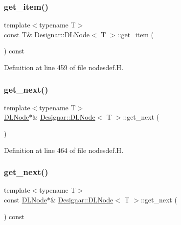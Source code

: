 \subsubsection{\texorpdfstring{get\+\_\+item()}{get\_item()}\hspace{0.1cm}{\footnotesize\ttfamily [2/2]}}
{\footnotesize\ttfamily template$<$typename T$>$ \\
const T\& \hyperlink{class_designar_1_1_d_l_node}{Designar\+::\+D\+L\+Node}$<$ T $>$\+::get\+\_\+item (\begin{DoxyParamCaption}{ }\end{DoxyParamCaption}) const\hspace{0.3cm}{\ttfamily [inline]}}



Definition at line 459 of file nodesdef.\+H.

\mbox{\label{class_designar_1_1_d_l_node_a28ad2b7a46044b5e798e06888631bbde}} 
\subsubsection{\texorpdfstring{get\+\_\+next()}{get\_next()}\hspace{0.1cm}{\footnotesize\ttfamily [1/2]}}
{\footnotesize\ttfamily template$<$typename T$>$ \\
\hyperlink{class_designar_1_1_d_l_node}{D\+L\+Node}$\ast$\& \hyperlink{class_designar_1_1_d_l_node}{Designar\+::\+D\+L\+Node}$<$ T $>$\+::get\+\_\+next (\begin{DoxyParamCaption}{ }\end{DoxyParamCaption})\hspace{0.3cm}{\ttfamily [inline]}}



Definition at line 464 of file nodesdef.\+H.

\mbox{\label{class_designar_1_1_d_l_node_a2e9212d8d5bec7b811c8ca11948bdad6}} 
\subsubsection{\texorpdfstring{get\+\_\+next()}{get\_next()}\hspace{0.1cm}{\footnotesize\ttfamily [2/2]}}
{\footnotesize\ttfamily template$<$typename T$>$ \\
const \hyperlink{class_designar_1_1_d_l_node}{D\+L\+Node}$\ast$\& \hyperlink{class_designar_1_1_d_l_node}{Designar\+::\+D\+L\+Node}$<$ T $>$\+::get\+\_\+next (\begin{DoxyParamCaption}{ }\end{DoxyParamCaption}) const\hspace{0.3cm}{\ttfamily [inline]}}



